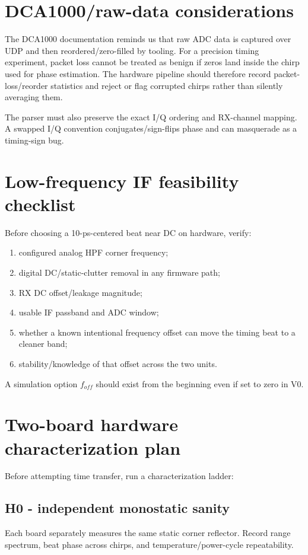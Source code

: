 \documentclass[11pt]{article}
\begin{document}
\section{DCA1000/raw-data considerations}
The DCA1000 documentation reminds us that raw ADC data is captured over UDP and then reordered/zero-filled by tooling. For a precision timing experiment, packet loss cannot be treated as benign if zeros land inside the chirp used for phase estimation. The hardware pipeline should therefore record packet-loss/reorder statistics and reject or flag corrupted chirps rather than silently averaging them.

The parser must also preserve the exact I/Q ordering and RX-channel mapping. A swapped I/Q convention conjugates/sign-flips phase and can masquerade as a timing-sign bug.

\section{Low-frequency IF feasibility checklist}
Before choosing a 10-ps-centered beat near DC on hardware, verify:
\begin{enumerate}
\item configured analog HPF corner frequency;
\item digital DC/static-clutter removal in any firmware path;
\item RX DC offset/leakage magnitude;
\item usable IF passband and ADC window;
\item whether a known intentional frequency offset can move the timing beat to a cleaner band;
\item stability/knowledge of that offset across the two units.
\end{enumerate}
A simulation option $f_{off}$ should exist from the beginning even if set to zero in V0.

\section{Two-board hardware characterization plan}
Before attempting time transfer, run a characterization ladder:
\subsection*{H0 - independent monostatic sanity}
Each board separately measures the same static corner reflector. Record range spectrum, beat phase across chirps, and temperature/power-cycle repeatability.
\end{document}
